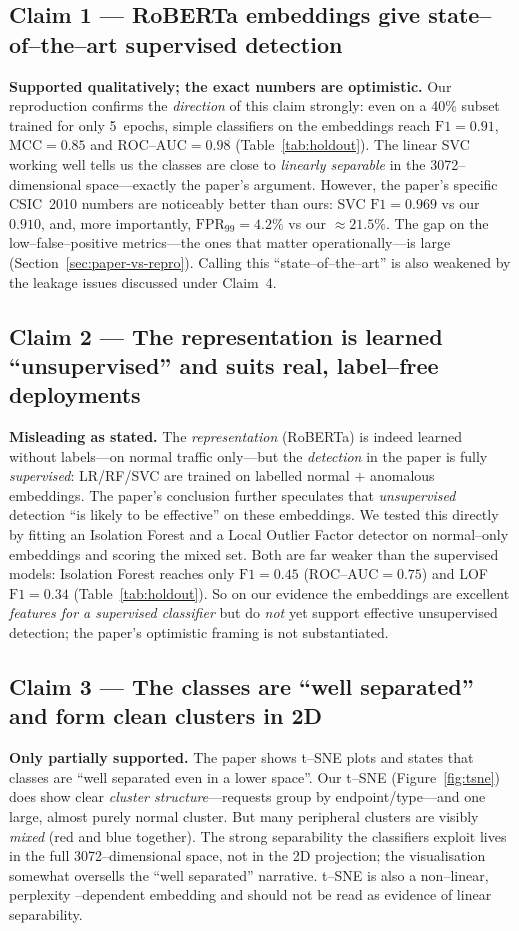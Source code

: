 \documentclass[11pt,a4paper]{article}
\begin{document}
\subsection{Claim 1 --- RoBERTa embeddings give state--of--the--art supervised detection}
\textbf{Supported qualitatively; the exact numbers are optimistic.} Our reproduction
confirms the \emph{direction} of this claim strongly: even on a 40\% subset trained for
only 5~epochs, simple classifiers on the embeddings reach $\text{F1}=0.91$,
$\text{MCC}=0.85$ and $\text{ROC--AUC}=0.98$ (Table~\ref{tab:holdout}). The linear SVC
working well tells us the classes are close to \emph{linearly separable} in the
3072--dimensional space---exactly the paper's argument. However, the paper's specific
CSIC~2010 numbers are noticeably better than ours: SVC $\text{F1}=0.969$ vs our
$0.910$, and, more importantly, $\text{FPR}_{99}=4.2\%$ vs our $\approx21.5\%$. The
gap on the low--false--positive metrics---the ones that matter operationally---is large
(Section~\ref{sec:paper-vs-repro}). Calling this ``state--of--the--art'' is also
weakened by the leakage issues discussed under Claim~4.

\subsection{Claim 2 --- The representation is learned ``unsupervised'' and suits real,
label--free deployments}
\textbf{Misleading as stated.} The \emph{representation} (RoBERTa) is indeed learned
without labels---on normal traffic only---but the \emph{detection} in the paper is fully
\emph{supervised}: LR/RF/SVC are trained on labelled normal $+$ anomalous embeddings. The
paper's conclusion further speculates that \emph{unsupervised} detection ``is likely to
be effective'' on these embeddings. We tested this directly by fitting an Isolation
Forest and a Local Outlier Factor detector on normal--only embeddings and scoring the
mixed set. Both are far weaker than the supervised models: Isolation Forest reaches only
$\text{F1}=0.45$ ($\text{ROC--AUC}=0.75$) and LOF $\text{F1}=0.34$
(Table~\ref{tab:holdout}). So on our evidence the embeddings are excellent \emph{features
for a supervised classifier} but do \emph{not} yet support effective unsupervised
detection; the paper's optimistic framing is not substantiated.

\subsection{Claim 3 --- The classes are ``well separated'' and form clean clusters in 2D}
\textbf{Only partially supported.} The paper shows t--SNE plots and states that classes
are ``well separated even in a lower space''. Our t--SNE (Figure~\ref{fig:tsne}) does show
clear \emph{cluster structure}---requests group by endpoint/type---and one large,
almost purely normal cluster. But many peripheral clusters are visibly \emph{mixed}
(red and blue together). The strong separability the classifiers exploit lives in the
full 3072--dimensional space, not in the 2D projection; the visualisation somewhat
oversells the ``well separated'' narrative. t--SNE is also a non--linear, perplexity
--dependent embedding and should not be read as evidence of linear separability.
\end{document}
